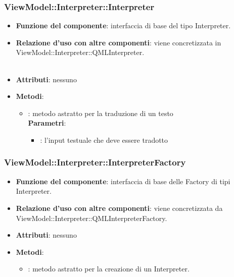 \subsubsection{ViewModel::Interpreter::Interpreter}
\begin{itemize}
\item\textbf{Funzione del componente}: interfaccia di base del tipo Interpreter.
	\item\textbf{Relazione d'uso con altre componenti}: viene concretizzata in ViewModel::Interpreter::QMLInterpreter.\\ \\

\item\textbf{Attributi}: nessuno
\item\textbf{Metodi}:
	\begin{itemize}
		\item{}: metodo astratto per la traduzione di un testo\\
		\textbf{Parametri}:
			\begin{itemize}
				\item{}: l'input testuale che deve essere tradotto \\
			\end{itemize}
	\end{itemize}
\end{itemize}

\subsubsection{ViewModel::Interpreter::InterpreterFactory}
\begin{itemize}
\item\textbf{Funzione del componente}: interfaccia di base delle Factory di tipi Interpreter.
	\item\textbf{Relazione d'uso con altre componenti}: viene concretizzata da ViewModel::Interpreter::QMLInterpreterFactory.\\ 
\item\textbf{Attributi}: nessuno
\item\textbf{Metodi}:
	\begin{itemize}
		\item{}: metodo astratto per la creazione di un Interpreter.\\
	\end{itemize}
\end{itemize}

